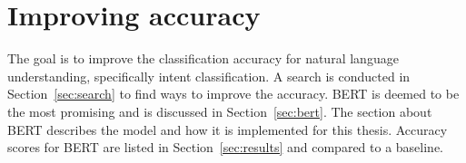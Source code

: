 \chapter{Improving accuracy}
\label{ch:improving_accuracy}

The goal is to improve the classification accuracy for natural language understanding, specifically intent classification.
A search is conducted in Section~\ref{sec:search} to find ways to improve the accuracy.
BERT is deemed to be the most promising and is discussed in Section~\ref{sec:bert}.
The section about BERT describes the model and how it is implemented for this thesis.
Accuracy scores for BERT are listed in Section~\ref{sec:results} and compared to a baseline.






